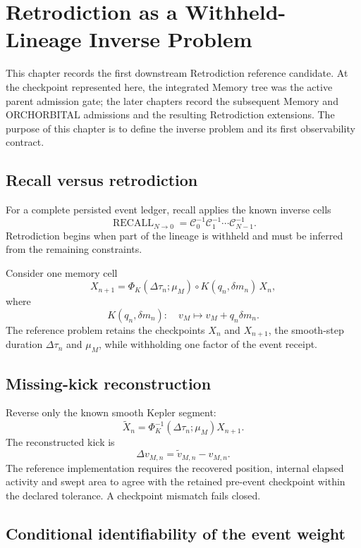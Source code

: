 \chapter{Retrodiction as a Withheld-Lineage Inverse Problem}

This chapter records the first downstream Retrodiction reference candidate. At the checkpoint represented here, the integrated Memory tree was the active parent admission gate; the later chapters record the subsequent Memory and ORCHORBITAL admissions and the resulting Retrodiction extensions. The purpose of this chapter is to define the inverse problem and its first observability contract.

\section{Recall versus retrodiction}

For a complete persisted event ledger, recall applies the known inverse cells
\[
\operatorname{RECALL}_{N\to0}
=\mathcal C_0^{-1}\mathcal C_1^{-1}\cdots\mathcal C_{N-1}^{-1}.
\]
Retrodiction begins when part of the lineage is withheld and must be inferred from the remaining constraints.

Consider one memory cell
\[
X_{n+1}
=\Phi_K(\Delta\tau_n;\mu_M)
\circ K(q_n,\delta m_n)
\,X_n,
\]
where
\[
K(q_n,\delta m_n):
\quad v_M\mapsto v_M+q_n\delta m_n.
\]
The reference problem retains the checkpoints \(X_n\) and \(X_{n+1}\), the smooth-step duration \(\Delta\tau_n\) and \(\mu_M\), while withholding one factor of the event receipt.

\section{Missing-kick reconstruction}

Reverse only the known smooth Kepler segment:
\[
\widetilde X_n
=\Phi_K^{-1}(\Delta\tau_n;\mu_M)X_{n+1}.
\]
The reconstructed kick is
\[
\boxed{
\Delta v_{M,n}
=\widetilde v_{M,n}-v_{M,n}.
}
\]
The reference implementation requires the recovered position, internal elapsed activity and swept area to agree with the retained pre-event checkpoint within the declared tolerance. A checkpoint mismatch fails closed.

\section{Conditional identifiability of the event weight}

